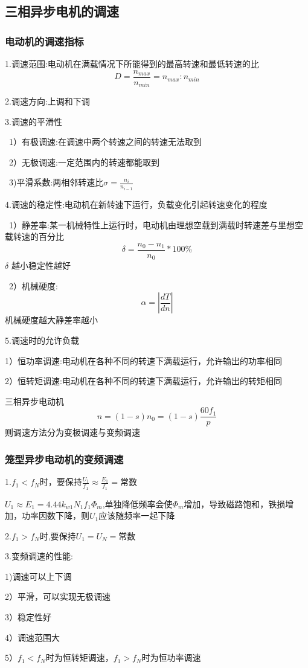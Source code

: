 \documentclass[11pt,twoside,a4paper]{ctexart}
\begin{document}
\subsection{三相异步电机的调速}

\subsubsection{电动机的调速指标}

1.调速范围:电动机在满载情况下所能得到的最高转速和最低转速的比
\[D = \frac{n_{max}}{n_{min}} = n_{max} : n_{min} \]

2.调速方向:上调和下调

3.调速的平滑性

\ 1）有极调速:在调速中两个转速之间的转速无法取到

\ 2）无极调速:一定范围内的转速都能取到

\ 3)平滑系数:两相邻转速比$\sigma = \frac{n_i}{n_{i - 1}}$

4.调速的稳定性:电动机在新转速下运行，负载变化引起转速变化的程度

\ 1）静差率:某一机械特性上运行时，电动机由理想空载到满载时转速差与里想空载转速的百分比
 \[\delta = \frac{n_0 - n_1}{n_0}*100\% \]
 $\delta$ 越小稳定性越好
 
 \ 2）机械硬度:
  \[\alpha = |\frac{dT}{dn}|\]
  机械硬度越大静差率越小

5.调速时的允许负载

1）恒功率调速:电动机在各种不同的转速下满载运行，允许输出的功率相同

2）恒转矩调速:电动机在各种不同的转速下满载运行，允许输出的转矩相同

三相异步电动机
\[n = (1 - s)n_0 = (1 - s)\frac{60f_1}{p}\]
则调速方法分为变极调速与变频调速

\subsubsection{笼型异步电动机的变频调速}

1.$f_1 < f_N$时，要保持$\frac{U_1}{f_1} \approx \frac{E_1}{f_1} = $常数

$U_1 \approx E_1 = 4.44k_{w1}N_1f_1\varPhi _m$,单独降低频率会使$\varPhi _m$增加，导致磁路饱和，铁损增加，功率因数下降，则$U_1$应该随频率一起下降

2.$f_1 > f_N$时,要保持$U_1 = U_N = $常数

3.变频调速的性能:
\begin{minipage}[t]{0.9\linewidth}
    
    1)调速可以上下调

    2）平滑，可以实现无极调速

    3）稳定性好

    4）调速范围大

    5）$f_1 < f_N$时为恒转矩调速，$f_1 > f_N$时为恒功率调速

\end{minipage}
\end{document}
